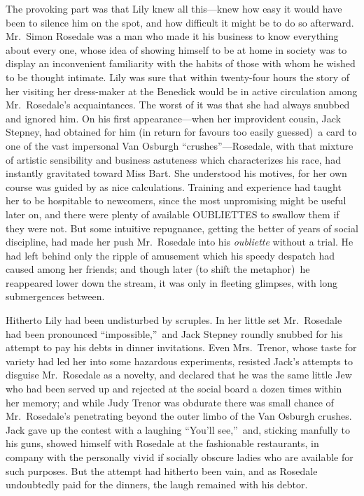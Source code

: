 \documentclass[12pt,a4paper]{book}
\begin{document}
The provoking part was that Lily knew all this---knew how easy it
would have been to silence him on the spot, and how difficult it
might be to do so afterward. Mr.\ Simon Rosedale was a man who
made it his business to know everything about every one, whose
idea of showing himself to be at home in society was to display
an inconvenient familiarity with the habits of those with whom he
wished to be thought intimate. Lily was sure that within
twenty-four hours the story of her visiting her dress-maker at
the Benedick would be in active circulation among Mr.\ Rosedale's
acquaintances. The worst of it was that she had always snubbed
and ignored him. On his first appearance---when her
improvident cousin, Jack Stepney, had obtained for him (in return
for favours too easily guessed)\ a card to one of the vast
impersonal Van Osburgh ``crushes''---Rosedale, with that mixture of
artistic sensibility and business astuteness which characterizes
his race, had instantly gravitated toward Miss Bart. She
understood his motives, for her own course was guided by as nice
calculations. Training and experience had taught her to be
hospitable to newcomers, since the most unpromising might be
useful later on, and there were plenty of available OUBLIETTES to
swallow them if they were not. But some intuitive repugnance,
getting the better of years of social discipline, had made her
push Mr.\ Rosedale into his \textit{oubliette} without a trial. He had left
behind only the ripple of amusement which his speedy despatch had
caused among her friends; and though later (to shift the
metaphor)\ he reappeared lower down the stream, it was only in
fleeting glimpses, with long submergences between.





Hitherto Lily had been undisturbed by scruples. In her little set
Mr.\ Rosedale had been pronounced ``impossible,''\ and Jack Stepney
roundly snubbed for his attempt to pay his debts in dinner
invitations. Even Mrs.\ Trenor, whose taste for variety had led
her into some hazardous experiments, resisted Jack's attempts to
disguise Mr.\ Rosedale as a novelty, and declared that he was the
same little Jew who had been served up and rejected at the social
board a dozen times within her memory; and while Judy Trenor was
obdurate there was small chance of Mr.\ Rosedale's penetrating
beyond the outer limbo of the Van Osburgh crushes. Jack gave up
the contest with a laughing ``You'll see,''\ and, sticking manfully
to his guns, showed himself with Rosedale at the fashionable
restaurants, in company with the personally vivid if socially
obscure ladies who are available for such purposes. But the
attempt had hitherto been vain, and as Rosedale undoubtedly paid
for the dinners, the laugh remained with his debtor.
\end{document}
